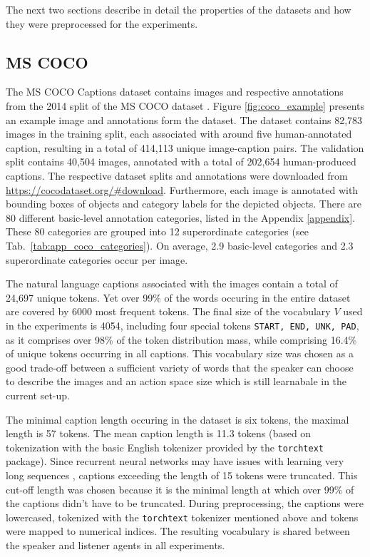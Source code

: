 The next two sections describe in detail the properties of the datasets and how they were preprocessed for the experiments.

\subsection{MS COCO}
\label{ds:coco}
The MS COCO Captions dataset \parencite{chen2015microsoft} contains images and respective annotations from the 2014 split of the MS COCO dataset \parencite{lin2014microsoft}. Figure \ref{fig:coco_example} presents an example image and annotations form the dataset. The dataset contains 82,783 images in the training split, each associated with around five human-annotated caption, resulting in a total of 414,113 unique image-caption pairs. The validation split contains 40,504 images, annotated with a total of 202,654 human-produced captions. The respective dataset splits and annotations were downloaded from \url{https://cocodataset.org/#download}.
Furthermore, each image is annotated with bounding boxes of objects and category labels for the depicted objects. There are 80 different basic-level annotation categories, listed in the Appendix \ref{appendix}. These 80 categories are grouped into 12 superordinate categories (see Tab.~\ref{tab:app_coco_categories}).
On average, 2.9 basic-level categories and 2.3 superordinate categories occur per image.

The natural language captions associated with the images contain a total of 24,697 unique tokens. Yet over 99\% of the words occuring in the entire dataset are covered by 6000 most frequent tokens. 
The final size of the vocabulary $V$ used in the experiments is 4054, including four special tokens \texttt{START, END, UNK, PAD}, as it comprises over 98\% of the token distribution mass, while comprising 16.4\% of unique tokens occurring in all captions. This vocabulary size was chosen as a good trade-off between a sufficient variety of words that the speaker can choose to describe the images and an action space size which is still learnabale in the current set-up. 

The minimal caption length occuring in the dataset is six tokens, the maximal length is 57 tokens. The mean caption length is 11.3 tokens (based on tokenization with the basic English tokenizer provided by the \texttt{torchtext} package). Since recurrent neural networks may have issues with learning very long sequences \parencite[e. g.,][]{jaeger2002tutorial}, captions exceeding the length of 15 tokens were truncated. This cut-off length was chosen because it is the minimal length at which over 99\% of the captions didn't have to be truncated. %
During preprocessing, the captions were lowercased, tokenized with the \texttt{torchtext} tokenizer mentioned above and tokens were mapped to numerical indices. The resulting vocabulary is shared between the speaker and listener agents in all experiments. 

